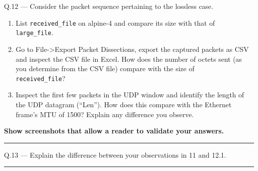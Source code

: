 \documentclass{article}
\newcommand\Que[2]{%
   \begin{samepage}
   \leavevmode\par
   \noindent
   Q.#1 --- #2\par\vspace{10pt}\hrule\vspace{10pt}
   \end{samepage}}
\begin{document}
\Que{12}{
Consider the packet sequence pertaining to the lossless case.
\begin{enumerate}
\item List \texttt{received\_file} on alpine-4 and compare its
   size with that of \\ \texttt{large\_file}.
\item Go to File->Export Packet Dissections, export the captured
   packets as CSV and inspect the CSV file in Excel. How does
   the number of octets sent (as you determine from the CSV
   file) compare with the size of\\ \texttt{received\_file}?
\item Inspect the first few packets in the UDP window and
   identify the length of the UDP datagram (``Len''). How does
   this compare with the Ethernet frame's MTU of 1500? Explain
   any difference you observe.
\end{enumerate}

\textbf{Show screenshots that allow a reader to validate your answers.}}

\Que{13}{Explain the difference between your observations in 11
and 12.1.}
\end{document}
